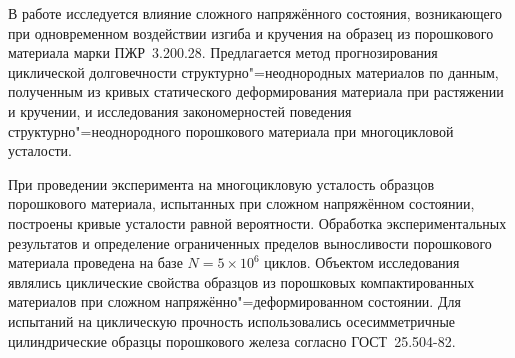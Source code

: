 


\date{27/IV/2011} %



\maketitle

\small


 В работе исследуется влияние сложного напряжённого состояния, возникающего при одновременном воздействии
изгиба и кручения на образец из порошкового материала марки ПЖР~3.200.28. Предлагается метод прогнозирования циклической
долговечности структурно"=неоднородных материалов по данным, полученным из кривых статического деформирования материала при
растяжении и кручении, и исследования закономерностей поведения структурно"=неоднородного порошкового материала при многоцикловой
усталости.

\smallskip

При проведении эксперимента на многоцикловую 
усталость образцов
порошкового материала, испытанных при сложном напряжённом
состоянии, построены кривые усталости равной вероятности.
Обработка экспериментальных результатов и определение ограниченных
пределов выносливости порошкового материала проведена на базе $N=5
\times 10^6$ циклов. Объектом  исследования являлись циклические
свойства образцов из порошковых компактированных материалов при
сложном напряжённо"=деформированном состоянии. Для испытаний на
циклическую прочность использовались осесимметричные
цилиндрические образцы порошкового железа согласно ГОСТ~25.504-82.

